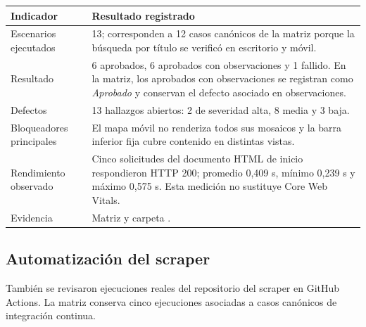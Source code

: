 \documentclass[11pt,a4paper]{article}
\begin{document}
\begin{longtable}{@{}L{5.1cm}L{9.7cm}@{}}
\toprule
\textbf{Indicador} & \textbf{Resultado registrado} \\
\midrule
\endhead
Escenarios ejecutados & 13; corresponden a 12 casos canónicos de la matriz porque la búsqueda por título se verificó en escritorio y móvil. \\
Resultado & 6 aprobados, 6 aprobados con observaciones y 1 fallido. En la matriz, los aprobados con observaciones se registran como \emph{Aprobado} y conservan el defecto asociado en observaciones. \\
Defectos & 13 hallazgos abiertos: 2 de severidad alta, 8 media y 3 baja. \\
Bloqueadores principales & El mapa móvil no renderiza todos sus mosaicos y la barra inferior fija cubre contenido en distintas vistas. \\
Rendimiento observado & Cinco solicitudes del documento HTML de inicio respondieron HTTP 200; promedio 0,409 s, mínimo 0,239 s y máximo 0,575 s. Esta medición no sustituye Core Web Vitals. \\
Evidencia & Matriz  y carpeta . \\
\bottomrule
\end{longtable}

\subsection{Automatización del scraper}

También se revisaron ejecuciones reales del repositorio del scraper en GitHub Actions.
La matriz conserva cinco ejecuciones asociadas a casos canónicos de integración continua.
\end{document}
